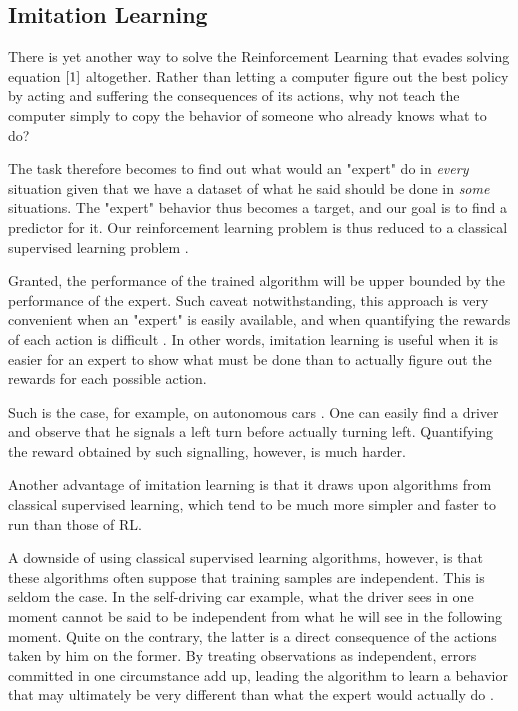 \documentclass{article}
\begin{document}
\subsection{Imitation Learning}

There is yet another way to solve the Reinforcement Learning that evades solving equation $\ref{1}$ altogether. Rather than letting a computer figure out the best policy by acting and suffering the consequences of its actions, why not teach the computer simply to copy the behavior of someone who already knows what to do?

The task therefore becomes to find out what would an "expert" do in \emph{every} situation given that we have a dataset of what he said should be done in \emph{some} situations. The "expert" behavior thus becomes a target, and our goal is to find a predictor for it. Our reinforcement learning problem is thus reduced to a classical supervised learning problem \cite{rashidinejad2021}.

Granted, the performance of the trained algorithm will be upper bounded by the performance of the expert. Such caveat notwithstanding, this approach is very convenient when an "expert" is easily available, and when quantifying the rewards of each action is difficult \cite{smartlab2021}. In other words, imitation learning is useful when it is easier for an expert to show what must be done than to actually figure out the rewards for each possible action.

Such is the case, for example, on autonomous cars \cite{pomerleau-2021}. One can easily find a driver and observe that he signals a left turn before actually turning left. Quantifying the reward obtained by such signalling, however, is much harder.

Another advantage of imitation learning is that it draws upon algorithms from classical supervised learning, which tend to be much more simpler and faster to run than those of RL.

A downside of using classical supervised learning algorithms, however, is that these algorithms often suppose that training samples are independent. This is seldom the case. In the self-driving car example, what the driver sees in one moment cannot be said to be independent from what he will see in the following moment. Quite on the contrary, the latter is a direct consequence of the actions taken by him on the former. By treating observations as independent, errors committed in one circumstance add up, leading the algorithm to learn a behavior that may ultimately be very different than what the expert would actually do \cite{rashidinejad2021}.
\end{document}
